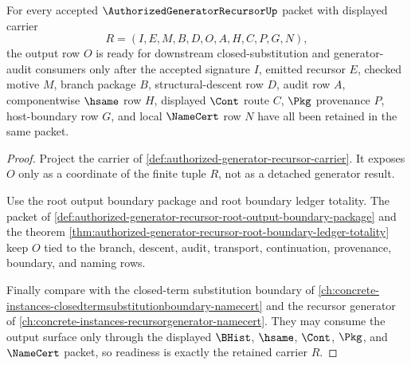 \begin{theorem}
\label{thm:authorized-generator-recursor-output-readiness}
For every accepted $\AuthorizedGeneratorRecursorUp$ packet with displayed carrier
$$
R=(I,E,M,B,D,O,A,H,C,P,G,N),
$$
the output row $O$ is ready for downstream closed-substitution and generator-audit consumers only after the accepted signature $I$, emitted recursor $E$, checked motive $M$, branch package $B$, structural-descent row $D$, audit row $A$, componentwise $\hsame$ row $H$, displayed $\Cont$ route $C$, $\Pkg$ provenance $P$, host-boundary row $G$, and local $\NameCert$ row $N$ have all been retained in the same packet.
\end{theorem}
\begin{proof}
Project the carrier of \autoref{def:authorized-generator-recursor-carrier}. It exposes $O$ only as a coordinate of the finite tuple $R$, not as a detached generator result.

Use the root output boundary package and root boundary ledger totality. The packet of \autoref{def:authorized-generator-recursor-root-output-boundary-package} and the theorem \autoref{thm:authorized-generator-recursor-root-boundary-ledger-totality} keep $O$ tied to the branch, descent, audit, transport, continuation, provenance, boundary, and naming rows.

Finally compare with the closed-term substitution boundary of \autoref{ch:concrete-instances-closedtermsubstitutionboundary-namecert} and the recursor generator of \autoref{ch:concrete-instances-recursorgenerator-namecert}. They may consume the output surface only through the displayed $\BHist$, $\hsame$, $\Cont$, $\Pkg$, and $\NameCert$ packet, so readiness is exactly the retained carrier $R$.
\end{proof}

